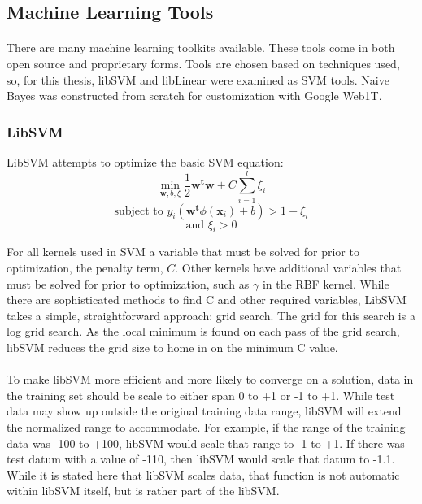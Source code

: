 	\subsection {Machine Learning Tools}
	\paragraph{} There are many machine learning toolkits available.  These tools come in both open source and proprietary forms.  Tools are chosen based on techniques used, so, for this thesis, libSVM and libLinear were examined as SVM tools.  Naive Bayes was constructed from scratch for customization with Google Web1T.

		\subsubsection{LibSVM} LibSVM attempts to optimize the basic SVM equation:
		\begin{equation} \min_{\mathbf{w}, b, \xi} \frac{1}{2} \mathbf{w^t w} + C \sum_{i=1}^{l} \xi_i \end{equation}
		\begin{equation} \text{subject to } y_i( \mathbf{w^t}\phi ( \mathbf{x}_i ) + b ) > 1- \xi_i \end{equation}
		\begin{equation} \text{and } \xi_i > 0\end{equation}

		For all kernels used in SVM a variable that must be solved for prior to optimization, the penalty term, $C$.  Other kernels have additional variables that must be solved for prior to optimization, such as $\gamma$ in the RBF kernel.  While there are sophisticated methods to find C and other required variables, LibSVM takes a simple, straightforward approach: grid search.  The grid for this search is a log grid search.  As the local minimum is found on each pass of the grid search, libSVM reduces the grid size to home in on the minimum C value.  

			\paragraph{} To make libSVM more efficient and more likely to converge on a solution, data in the training set should be scale to either span 0 to +1 or -1 to +1.  While test data may show up outside the original training data range, libSVM will extend the normalized range to accommodate.  For example, if the range of the training data was -100 to +100, libSVM would scale that range to -1 to +1.  If there was test datum with a value of -110, then libSVM would scale that datum to -1.1.  While it is stated here that libSVM scales data, that function is not automatic within libSVM itself, but is rather part of the libSVM.
		
